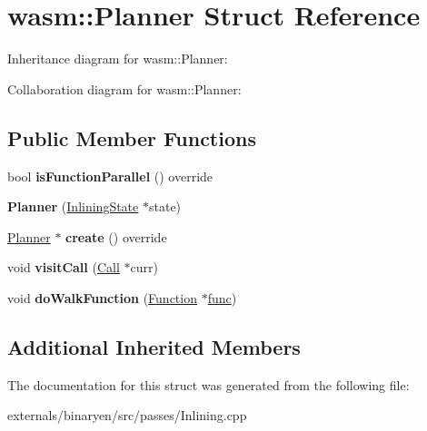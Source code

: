 \hypertarget{structwasm_1_1_planner}{}\section{wasm\+:\+:Planner Struct Reference}
\label{structwasm_1_1_planner}


Inheritance diagram for wasm\+:\+:Planner\+:


Collaboration diagram for wasm\+:\+:Planner\+:
\subsection*{Public Member Functions}
\begin{DoxyCompactItemize}
\item 
\mbox{\label{structwasm_1_1_planner_a4152bbf05bf4427c7be18f0bc9923205}} 
bool {\bfseries is\+Function\+Parallel} () override
\item 
\mbox{\label{structwasm_1_1_planner_ad9511a09bae857210511391fa2d9f435}} 
{\bfseries Planner} (\mbox{\hyperlink{structwasm_1_1_inlining_state}{Inlining\+State}} $\ast$state)
\item 
\mbox{\label{structwasm_1_1_planner_a2b1d8275486182448c247ac8e2b3e2a3}} 
\mbox{\hyperlink{structwasm_1_1_planner}{Planner}} $\ast$ {\bfseries create} () override
\item 
\mbox{\label{structwasm_1_1_planner_aacc5816684c2b2e922f1c7d956b6c712}} 
void {\bfseries visit\+Call} (\mbox{\hyperlink{classwasm_1_1_call}{Call}} $\ast$curr)
\item 
\mbox{\label{structwasm_1_1_planner_a185873b3a57b936d0edfdb6ae225b148}} 
void {\bfseries do\+Walk\+Function} (\mbox{\hyperlink{classwasm_1_1_function}{Function}} $\ast$\mbox{\hyperlink{structfunc}{func}})
\end{DoxyCompactItemize}
\subsection*{Additional Inherited Members}


The documentation for this struct was generated from the following file\+:\begin{DoxyCompactItemize}
\item 
externals/binaryen/src/passes/Inlining.\+cpp\end{DoxyCompactItemize}
